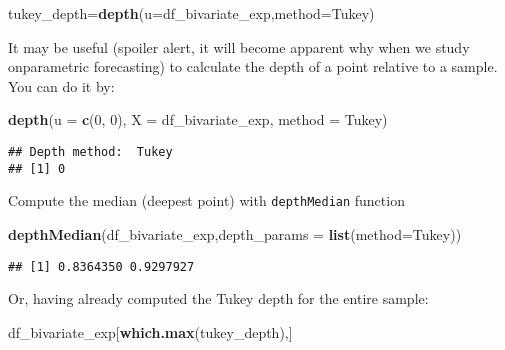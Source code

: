 \documentclass[
]{article}
\newenvironment{Shaded}{\begin{snugshade}}{\end{snugshade}}
\newcommand{\AttributeTok}[1]{\textcolor[rgb]{0.13,0.29,0.53}{#1}}
\newcommand{\DecValTok}[1]{\textcolor[rgb]{0.00,0.00,0.81}{#1}}
\newcommand{\FunctionTok}[1]{\textcolor[rgb]{0.13,0.29,0.53}{\textbf{#1}}}
\newcommand{\NormalTok}[1]{#1}
\newcommand{\OtherTok}[1]{\textcolor[rgb]{0.56,0.35,0.01}{#1}}
\newcommand{\StringTok}[1]{\textcolor[rgb]{0.31,0.60,0.02}{#1}}
\begin{document}
\begin{Shaded}
\begin{Highlighting}[]
\NormalTok{tukey\_depth}\OtherTok{=}\FunctionTok{depth}\NormalTok{(}\AttributeTok{u=}\NormalTok{df\_bivariate\_exp,}\AttributeTok{method=}\StringTok{\textquotesingle{}Tukey\textquotesingle{}}\NormalTok{)}
\end{Highlighting}
\end{Shaded}

It may be useful (spoiler alert, it will become apparent why when we
study onparametric forecasting) to calculate the depth of a point
relative to a sample. You can do it by:

\begin{Shaded}
\begin{Highlighting}[]
\FunctionTok{depth}\NormalTok{(}\AttributeTok{u =} \FunctionTok{c}\NormalTok{(}\DecValTok{0}\NormalTok{, }\DecValTok{0}\NormalTok{), }\AttributeTok{X =}\NormalTok{ df\_bivariate\_exp, }\AttributeTok{method =} \StringTok{\textquotesingle{}Tukey\textquotesingle{}}\NormalTok{) }
\end{Highlighting}
\end{Shaded}

\begin{verbatim}
## Depth method:  Tukey 
## [1] 0
\end{verbatim}

Compute the median (deepest point) with \texttt{depthMedian} function

\begin{Shaded}
\begin{Highlighting}[]
\FunctionTok{depthMedian}\NormalTok{(df\_bivariate\_exp,}\AttributeTok{depth\_params =} \FunctionTok{list}\NormalTok{(}\AttributeTok{method=}\StringTok{\textquotesingle{}Tukey\textquotesingle{}}\NormalTok{))}
\end{Highlighting}
\end{Shaded}

\begin{verbatim}
## [1] 0.8364350 0.9297927
\end{verbatim}

Or, having already computed the Tukey depth for the entire sample:

\begin{Shaded}
\begin{Highlighting}[]
\NormalTok{df\_bivariate\_exp[}\FunctionTok{which.max}\NormalTok{(tukey\_depth),]}
\end{Highlighting}
\end{Shaded}
\end{document}
